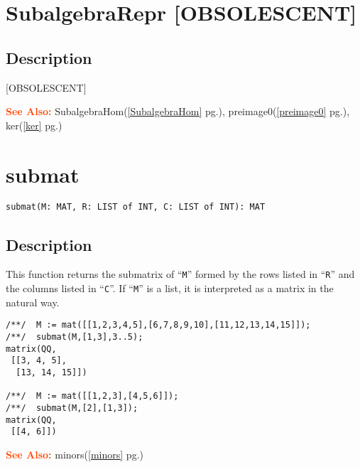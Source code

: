 \documentclass[a4paper]{mybook}
\newenvironment{command}{}{} %
\newcommand\SeeAlso{\par\textcolor{OrangeRed}{\textbf{\large See Also: }}}
\begin{document}
\section{SubalgebraRepr [OBSOLESCENT]}
\label{SubalgebraRepr [OBSOLESCENT]}
\begin{command} %



\subsection*{Description}

[OBSOLESCENT]

\SeeAlso %
  SubalgebraHom(\ref{SubalgebraHom} pg.\pageref{SubalgebraHom}), 
    preimage0(\ref{preimage0} pg.\pageref{preimage0}), 
    ker(\ref{ker} pg.\pageref{ker})
\end{command} %

\section{submat}
\label{submat}
\begin{command} %


\begin{Verbatim}[label=syntax, rulecolor=\color{MidnightBlue},
frame=single]
submat(M: MAT, R: LIST of INT, C: LIST of INT): MAT
\end{Verbatim}


\subsection*{Description}

This function returns the submatrix of ``\verb&M&'' formed by the rows listed
in ``\verb&R&'' and the columns listed in ``\verb&C&''.   If ``\verb&M&'' is a list, it is interpreted
as a matrix in the natural way.
\begin{Verbatim}[label=example, rulecolor=\color{PineGreen}, frame=single]
/**/  M := mat([[1,2,3,4,5],[6,7,8,9,10],[11,12,13,14,15]]);
/**/  submat(M,[1,3],3..5);
matrix(QQ,
 [[3, 4, 5],
  [13, 14, 15]])

/**/  M := mat([[1,2,3],[4,5,6]]);
/**/  submat(M,[2],[1,3]);
matrix(QQ,
 [[4, 6]])
\end{Verbatim}


\SeeAlso %
  minors(\ref{minors} pg.\pageref{minors})
\end{command} %
\end{document}
